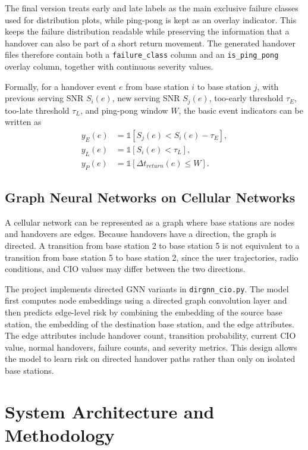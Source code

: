 \documentclass[11pt,a4paper]{article}
\begin{document}
The final version treats early and late labels as the main exclusive failure classes used for distribution plots, while ping-pong is kept as an overlay indicator. This keeps the failure distribution readable while preserving the information that a handover can also be part of a short return movement. The generated handover files therefore contain both a \texttt{failure\_class} column and an \texttt{is\_ping\_pong} overlay column, together with continuous severity values.

Formally, for a handover event $e$ from base station $i$ to base station $j$, with previous serving SNR $S_i(e)$, new serving SNR $S_j(e)$, too-early threshold $\tau_E$, too-late threshold $\tau_L$, and ping-pong window $W$, the basic event indicators can be written as
\begin{align}
y_E(e)&=\mathbb{1}[S_j(e)<S_i(e)-\tau_E],\\
y_L(e)&=\mathbb{1}[S_i(e)<\tau_L],\\
y_P(e)&=\mathbb{1}[\Delta t_{return}(e)\le W].
\end{align}

\subsection{Graph Neural Networks on Cellular Networks}
A cellular network can be represented as a graph where base stations are nodes and handovers are edges. Because handovers have a direction, the graph is directed. A transition from base station 2 to base station 5 is not equivalent to a transition from base station 5 to base station 2, since the user trajectories, radio conditions, and CIO values may differ between the two directions.

The project implements directed GNN variants in \texttt{dirgnn\_cio.py}. The model first computes node embeddings using a directed graph convolution layer and then predicts edge-level risk by combining the embedding of the source base station, the embedding of the destination base station, and the edge attributes. The edge attributes include handover count, transition probability, current CIO value, normal handovers, failure counts, and severity metrics. This design allows the model to learn risk on directed handover paths rather than only on isolated base stations.

\section{System Architecture and Methodology}
\label{sec:methodology}
\end{document}
